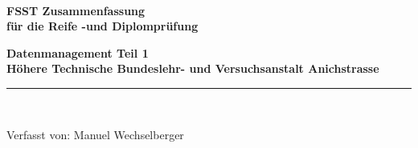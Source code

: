 \begin{titlepage}
 \begin{center}
   \begin{minipage}{\linewidth}
   \begin{center}
	\\[40mm]
	\fontsize{25pt}{25pt}\selectfont\bf{FSST Zusammenfassung}
	\\[19mm]{\fontsize{25pt}{25pt}\selectfont\bf{für die Reife -und Diplomprüfung}}
	\\[15mm]{\fontsize{15pt}{15pt}\selectfont\bf{Datenmanagement Teil 1}
	\\[15mm]{\fontsize{12.4pt}{12.4pt}\selectfont\bf
		Höhere Technische Bundeslehr- und Versuchsanstalt Anichstrasse}
	  \\[75mm]\rule{150mm}{0.5pt}
	  \\[ 5mm]
	  \parbox[t]{100mm}{
	  	\centering
	\fontsize{12.4pt}{12.4pt}\selectfont Verfasst von: Manuel Wechselberger
	}}
   \end{center}\hfill
   \end{minipage}
 \end{center}
\end{titlepage}


\addtocounter{page}{1}
